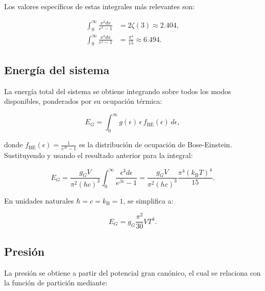 Los valores específicos de estas integrales más relevantes son:

\begin{align}
\int_0^\infty \frac{x^2 dx}{e^x - 1} &= 2\zeta(3) \approx 2.404, \\
\int_0^\infty \frac{x^3 dx}{e^x - 1} &= \frac{\pi^4}{15} \approx 6.494.
\end{align}


\subsection{Energía del sistema}
\label{app:BE-Energy}

La energía total del sistema se obtiene integrando sobre todos los modos disponibles, ponderados por su ocupación térmica:

\begin{equation}
E_G = \int_0^\infty g(\epsilon) \, \epsilon \, f_{\mathrm{BE}}(\epsilon)\, d\epsilon,
\end{equation}

donde \( f_{\mathrm{BE}}(\epsilon) = \frac{1}{e^{\beta\epsilon} - 1} \) es la distribución de ocupación de Bose-Einstein. Sustituyendo y usando el resultado anterior para la integral:

\begin{equation}
E_G = \frac{g_G V}{\pi^2 (hc)^3} \int_0^\infty \frac{\epsilon^3 d\epsilon}{e^{\beta\epsilon} - 1} = \frac{g_G V}{\pi^2 (hc)^3} \frac{\pi^4 ({k}_{\mathrm{B}} T)^4}{15}.
\end{equation}

En unidades naturales \( \hbar = c = {k}_{\mathrm{B}} = 1 \), se simplifica a:

\begin{equation}
E_G = g_G \frac{\pi^2}{30} V T^4.
\end{equation}


\subsection{Presión}
\label{app:BE-Pressure}

La presión se obtiene a partir del potencial gran canónico, el cual se relaciona con la función de partición mediante:

